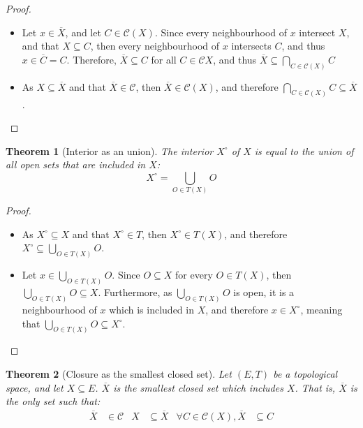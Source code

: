 \documentclass{article}
\newtheorem{theorem}{Theorem}[section]
\theoremstyle{definition}
\theoremstyle{remark}
\theoremstyle{example}
\theoremstyle{notation}
\newcommand{\inter}[1]{{{#1}^\circ}}
\newcommand{\adher}[1]{{\overline{#1}}}
\newcommand{\closed}{\mathcal{C}}
\begin{document}
\begin{proof}~
		\begin{itemize}
				\item Let $x \in \adher{X}$, and let $C \in \closed(X)$. Since every neighbourhood of $x$ intersect $X$, and that $X \subseteq C$, then every neighbourhood of $x$ intersects $C$, and thus $x \in \adher{C} = C$. Therefore, $\adher{X} \subseteq C$ for all $C \in \mathcal{C}{X}$, and thus $\adher{X} \subseteq \bigcap_{C \in \mathcal{C}(X)} C$
				\item As $X \subseteq \adher{X}$ and that $\adher{X} \in \closed$, then $\adher{X} \in \closed(X)$, and therefore $\bigcap_{C \in \closed(X)} C \subseteq \adher{X}$. 
		\end{itemize}
\end{proof}

\begin{theorem}[Interior as an union]
		The interior $\inter{X}$ of $X$ is equal to the union of all open sets that are included in $X$:
				$$\inter{X} = \bigcup_{O \in T(X)} O$$
\end{theorem}

\begin{proof}~
		\begin{itemize}
				\item As $\inter{X} \subseteq X$ and that $\inter{X} \in T$, then $\inter{X} \in T(X)$, and therefore $\inter{X} \subseteq \bigcup_{O \in T(X)} O$.
				\item Let $x \in \bigcup_{O \in T(X)} O$. Since $O \subseteq X$ for every $O \in T(X)$, then $\bigcup_{O \in T(X)} O \subseteq X$. Furthermore, as $\bigcup_{O \in T(X)} O$ is open, it is a neighbourhood of $x$ which is included in $X$, and therefore $x \in \inter{X}$, meaning that $\bigcup_{O \in T(X)} O \subseteq \inter{X}$. 
		\end{itemize}
\end{proof}


\begin{theorem}[Closure as the smallest closed set] \label{thm:closure-charac}
		Let $(E, T)$ be a topological space, and let $X \subseteq E$. $\overline{X}$ is the smallest closed set which includes $X$. That is, $\overline{X}$ is the only set such that:
		\begin{align*}
				\adher{X} &\in \closed & X &\subseteq \adher{X} & \forall C \in \closed(X), \adher{X} &\subseteq C
		\end{align*}
\end{theorem}
\end{document}
